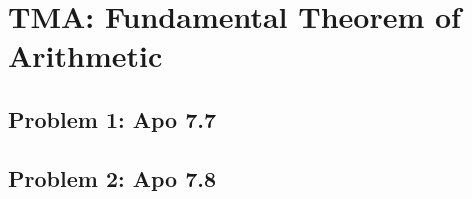 \section{TMA: Fundamental Theorem of Arithmetic}

\subsection[Problem 1]{Problem 1: Apo 7.7}

\subsection[Problem 2]{Problem 2: Apo 7.8}
